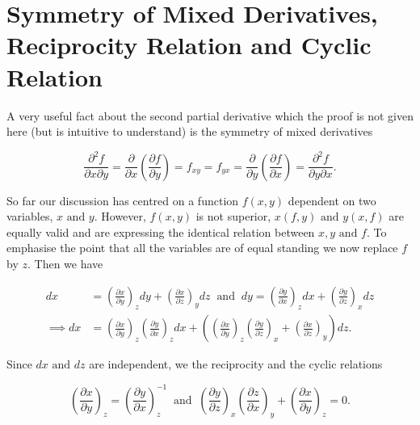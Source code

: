 \documentclass[english,a4paper,12pt]{report}
\begin{document}
\section{Symmetry of Mixed Derivatives, Reciprocity Relation and Cyclic Relation}

A very useful fact about the second partial derivative which the proof is not given here (but is intuitive to understand) is the symmetry of mixed derivatives

\begin{equation}
    \frac{\partial^2 f}{\partial x \partial y} = \frac{\partial }{\partial x} \left( \frac{\partial f}{\partial y}  \right) = f_{xy} = f_{yx} = \frac{\partial }{\partial y} \left( \frac{\partial f}{\partial x}  \right) = \frac{\partial^2 f}{\partial y \partial x}.     
\end{equation}

So far our discussion has centred on a function \(f(x,y)\) dependent on two variables, \(x\text { and } y\). However, \(f(x,y)\) is not superior, \(x(f,y) \text { and } y(x,f)\) are equally valid and are expressing the identical relation between \(x,y \text { and } f\). To emphasise the point that all the variables are of equal standing we now replace \(f\) by \(z\). Then we have

\begin{equation}
    \begin{aligned}
    dx &= \left( \frac{\partial x}{\partial y}  \right)_{z} dy + \left( \frac{\partial x}{\partial z}  \right)_{y} dz ~\text { and }~   dy = \left( \frac{\partial y}{\partial x}  \right)_{z} dx + \left( \frac{\partial y}{\partial z}  \right)_{x} dz \\
    \implies dx &= \left( \frac{\partial x}{\partial y}  \right)_{z} \left( \frac{\partial y}{\partial x}  \right)_{z} dx + \left( \left( \frac{\partial x}{\partial y}  \right)_{z}  \left( \frac{\partial y}{\partial z}  \right)_{x} + \left( \frac{\partial x}{\partial z}  \right)_{y}  \right) dz. 
    \end{aligned}
\end{equation}

Since \(dx \text { and }  dz\) are independent, we the reciprocity and the cyclic relations

\begin{equation}
    \left( \frac{\partial x}{\partial y}  \right)_{z} = \left( \frac{\partial y}{\partial x}  \right)_{z}^{-1} ~\text { and }~ \left( \frac{\partial y}{\partial z}  \right)_{x} \left( \frac{\partial z}{\partial x}  \right)_{y} + \left( \frac{\partial x}{\partial y}  \right)_{z} = 0.
\end{equation}
\end{document}
